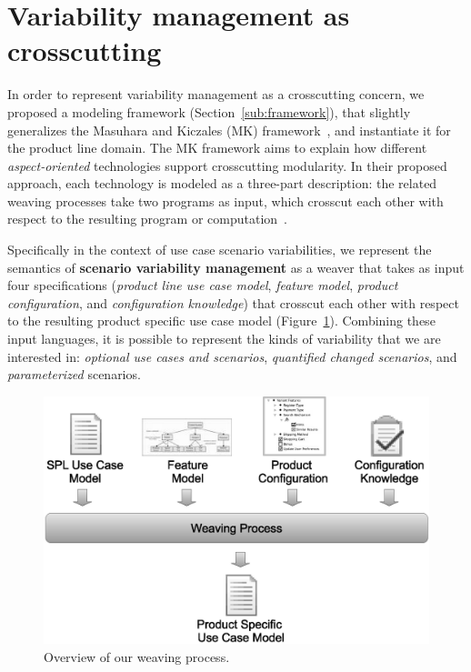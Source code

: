 \documentclass[times, 11pt,twocolumn]{article}
\begin{document}
\section{Variability management as crosscutting}\label{sec:vmcc}


In order to represent variability management as a crosscutting concern, we
proposed a modeling framework (Section~\ref{sub:framework}), that slightly
generalizes the Masuhara and Kiczales (MK) framework~\cite{Masuhara:2003aa}, and instantiate it for the 
product line domain. The MK framework aims to explain
how different \emph{aspect-oriented} technologies support crosscutting
modularity. In their proposed approach, each technology is modeled as a
three-part description: the related weaving processes take two programs as input, 
which crosscut each other with respect to the resulting program or
computation~\cite{Masuhara:2003aa}.

Specifically in the context of use case scenario variabilities, we represent the
semantics of \textbf{scenario variability management} as a weaver that takes as input four specifications
(\emph{product line use case model}, \emph{feature model}, \emph{product
configuration}, and \emph{configuration knowledge}) that crosscut each other with
respect to the resulting product specific use case model
(Figure~\ref{fig:weave-process}). Combining these input languages, it is possible
to represent the kinds of variability that we are interested in: \emph{optional
use cases and scenarios}, \emph{quantified changed scenarios}, and
\emph{parameterized} scenarios.

\begin{figure}[t]
 \begin{center}
  \includegraphics[scale=0.35]{../images/weave-process.eps}
  \caption{Overview of our weaving process.}
  \label{fig:weave-process}
  \end{center}
\end{figure}
\end{document}
